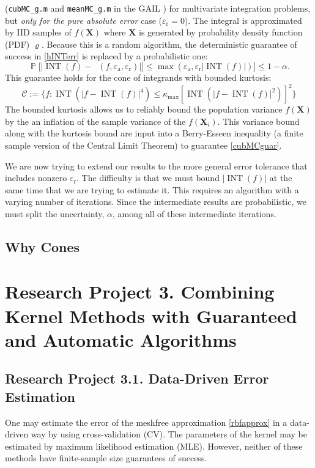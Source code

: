 \documentclass[11pt]{NSFamsart}
\DeclareMathOperator{\INT}{INT}
\DeclareMathOperator{\hINT}{\widehat{\INT}}
\newcommand{\bX}{{\boldsymbol{X}}}
\newcommand{\calc}{{\mathcal{C}}}
\DeclareMathOperator{\Prob}{\mathbb{P}}
\def\abs#1{\ensuremath{\left \lvert #1 \right \rvert}}
\newcommand{\bigabs}[1]{\ensuremath{\bigl \lvert #1 \bigr \rvert}}
\newcommand{\abstol}{\varepsilon_{\text{a}}}
\newcommand{\reltol}{\varepsilon_{\text{r}}}
\begin{document}
 (\texttt{cubMC\_g.m} and \texttt{meanMC\_g.m} in the GAIL \citep{ChoEtal14a}) for multivariate integration problems, but \emph{only for the pure absolute error} case ($\reltol=0$).  The integral is approximated by IID samples of $f(\bX)$ where $\bX$ is generated by probability density function (PDF) $\varrho$. Because this is a random algorithm, the deterministic guarantee of success in \eqref{hINTerr} is replaced by a probabilistic one:
\begin{equation} \label{cubMCguar}
 \Prob\bigl[\bigabs{\INT(f) -\hINT(f,\abstol,\reltol)} \bigr ] \le \max(\abstol,\reltol \abs{\INT(f)}) \bigr] \le 1-\alpha.
\end{equation}
This guarantee holds for the cone of integrands with bounded kurtosis:
\begin{equation}
\calc := \bigl \{ f : \INT(\abs{f - \INT(f)}^4) \le \kappa_{\max} [\INT(\abs{f - \INT(f)}^2)]^2 \bigr\}
\end{equation}
The bounded kurtosis allows us to reliably bound the population variance $f(\bX)$ by the an inflation of the sample variance of the $f(\bX_i)$. This variance bound along with the kurtosis bound are input into a Berry-Esseen inequality (a finite sample version of the Central Limit Theorem) to guarantee \eqref{cubMCguar}.

We are now trying to extend our results to the more general error tolerance that includes nonzero $\reltol$.  The difficulty is that we must bound $\abs{\INT(f)}$ at the same time that we are trying to estimate it.  This requires an algorithm with a varying number of iterations.  Since the intermediate results are probabilistic, we must split the uncertainty, $\alpha$, among all of these intermediate iterations.

\subsection*{Why Cones}



\section*{Research Project 3. Combining Kernel Methods with Guaranteed and Automatic Algorithms} \label{combinesec}

\subsection*{Research Project 3.1. Data-Driven Error Estimation}\label{errestsubsec} One may estimate the error of the meshfree approximation \eqref{rbfapprox} in a data-driven way by using cross-validation (CV).  The parameters of the kernel may be estimated by maximum likelihood estimation (MLE).  However, neither of these methods have finite-sample size guarantees of success.
\end{document}
